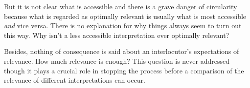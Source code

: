 But it is not clear what is accessible and there is a grave danger of circularity because what is regarded as optimally relevant is usually what is most accessible \emph{and} vice versa. There is no explanation for why things always seem to turn out this way. Why isn't a less accessible interpretation ever optimally relevant? 


Besides, nothing of consequence is said about an interlocutor's expectations of relevance. How much relevance is enough? This question is never addressed though it plays a crucial role in stopping the process before a comparison of the relevance of different interpretations can occur.

